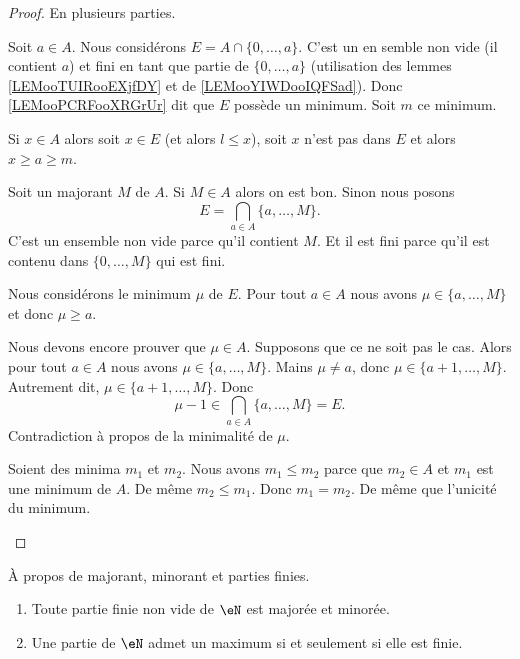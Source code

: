 \begin{proof}
	En plusieurs parties.
	\begin{subproof}
		Soit \( a\in A\). Nous considérons \( E=A\cap\{ 0,\ldots,a \}\). C'est un en semble non vide (il contient \( a\)) et fini en tant que partie de \( \{ 0,\ldots,a \}\) (utilisation des lemmes \ref{LEMooTUIRooEXjfDY} et de \ref{LEMooYIWDooIQFSad}). Donc \ref{LEMooPCRFooXRGrUr} dit que \( E\) possède un minimum. Soit \( m\) ce minimum.

		Si \( x\in A\) alors soit \( x\in E\) (et alors \( l\leq x\)), soit \( x\) n'est pas dans \( E\) et alors \( x\geq a\geq m\).

		Soit un majorant \( M\) de \( A\). Si \( M\in A\) alors on est bon. Sinon nous posons
		\begin{equation}
			E=\bigcap_{a\in A}\{ a,\ldots,M \}.
		\end{equation}
		C'est un ensemble non vide parce qu'il contient \( M\). Et il est fini parce qu'il est contenu dans \( \{ 0,\ldots,M \}\) qui est fini.

		Nous considérons le minimum \( \mu\) de \( E\). Pour tout \( a\in A\) nous avons \( \mu\in\{ a,\ldots,M \}\) et donc \( \mu\geq a\).

		Nous devons encore prouver que \( \mu\in A\). Supposons que ce ne soit pas le cas. Alors pour tout \( a\in A\) nous avons \( \mu\in \{ a,\ldots,M \}\). Mains \( \mu\neq a\), donc \( \mu\in\{ a+1,\ldots,M \}\). Autrement dit, \( \mu\in\{ a+1,\ldots,M \}\). Donc
		\begin{equation}
			\mu-1\in \bigcap_{a\in A}\{ a,\ldots,M \}=E.
		\end{equation}
		Contradiction à propos de la minimalité de \( \mu\).

		Soient des minima \( m_1\) et \( m_2\). Nous avons \( m_1\leq m_2\) parce que \( m_2\in A\) et \( m_1\) est une minimum de \( A\). De même \( m_2\leq m_1\). Donc \( m_1=m_2\).
		De même que l'unicité du minimum.
	\end{subproof}
\end{proof}

\begin{lemma}     \label{LEMooGQUWooYJQfJB}
	À propos de majorant, minorant et parties finies.
	\begin{enumerate}
		\item	\label{ITEMooOOOZooXTClck}
		      Toute partie finie non vide de \( \eN\) est majorée et minorée.
		\item		\label{ITEMooKXLXooVVwpnj}
		      Une partie de \( \eN\) admet un maximum si et seulement si elle est finie.
	\end{enumerate}
\end{lemma}

